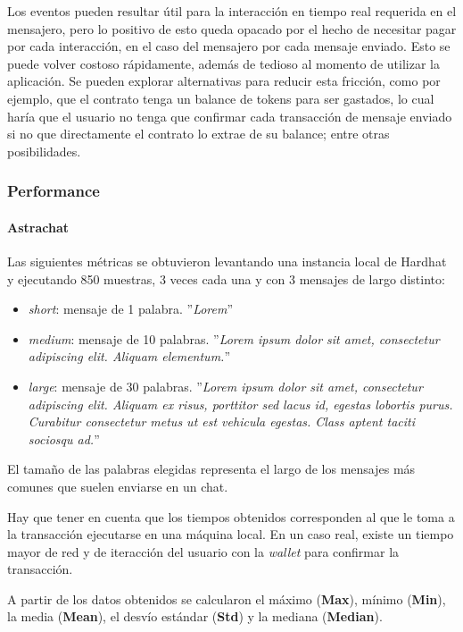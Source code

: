 Los eventos pueden resultar útil para la interacción en tiempo real requerida en el mensajero, pero lo positivo de esto queda opacado por el hecho de necesitar pagar por cada interacción, en el caso del mensajero por cada mensaje enviado. Esto se puede volver costoso rápidamente, además de tedioso al momento de utilizar la aplicación. Se pueden explorar alternativas para reducir esta fricción, como por ejemplo, que el contrato tenga un balance de tokens para ser gastados, lo cual haría que el usuario no tenga que confirmar cada transacción de mensaje enviado si no que directamente el contrato lo extrae de su balance; entre otras posibilidades.

\subsubsection{Performance\label{performance-blockchain}}

\paragraph{Astrachat}

Las siguientes métricas se obtuvieron levantando una instancia local de Hardhat \cite{hardhat} y ejecutando 850 muestras, 3 veces cada una y con 3 mensajes de largo distinto:

\begin{itemize}
    \item \textit{short}: mensaje de 1 palabra. ''\textit{Lorem}''
    \item \textit{medium}: mensaje de 10 palabras. ''\textit{Lorem ipsum dolor sit amet, consectetur adipiscing elit. Aliquam elementum.}''
    \item \textit{large}: mensaje de 30 palabras. ''\textit{Lorem ipsum dolor sit amet, consectetur adipiscing elit. Aliquam ex risus, porttitor sed lacus id, egestas lobortis purus. Curabitur consectetur metus ut est vehicula egestas. Class aptent taciti sociosqu ad.}''
\end{itemize}

El tamaño de las palabras elegidas representa el largo de los mensajes más comunes que suelen enviarse en un chat.

Hay que tener en cuenta que los tiempos obtenidos corresponden al que le toma a la transacción ejecutarse en una máquina local. En un caso real, existe un tiempo mayor de red y de iteracción del usuario con la \textit{wallet} para confirmar la transacción.

A partir de los datos obtenidos se calcularon el máximo (\textbf{Max}), mínimo (\textbf{Min}), la media (\textbf{Mean}), el desvío estándar (\textbf{Std}) y la mediana (\textbf{Median}).

